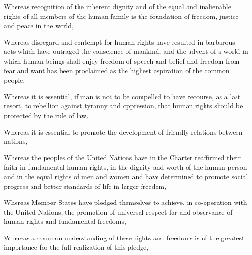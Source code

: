 \documentclass[a4paper]{article}
\begin{document}
Whereas recognition of the inherent dignity and of the equal and inalienable rights of all members of the human family is the foundation of freedom, justice and peace in the world,

Whereas disregard and contempt for human rights have resulted in barbarous acts which have outraged the conscience of mankind, and the advent of a world in which human beings shall enjoy freedom of speech and belief and freedom from fear and want has been proclaimed as the highest aspiration of the common people,

Whereas it is essential, if man is not to be compelled to have recourse, as a last resort, to rebellion against tyranny and oppression, that human rights should be protected by the rule of law,

Whereas it is essential to promote the development of friendly relations between nations,

Whereas the peoples of the United Nations have in the Charter reaffirmed their faith in fundamental human rights, in the dignity and worth of the human person and in the equal rights of men and women and have determined to promote social progress and better standards of life in larger freedom,

Whereas Member States have pledged themselves to achieve, in co-operation with the United Nations, the promotion of universal respect for and observance of human rights and fundamental freedoms,

Whereas a common understanding of these rights and freedoms is of the greatest importance for the full realization of this pledge,




\end{document}
